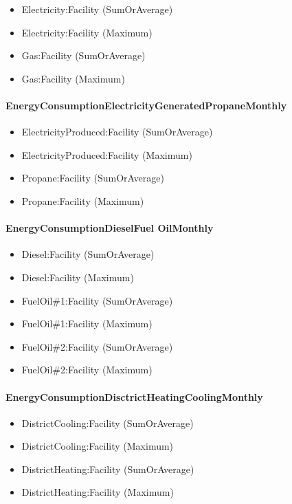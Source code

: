 \begin{itemize}
\item
  Electricity:Facility (SumOrAverage)
\item
  Electricity:Facility (Maximum)
\item
  Gas:Facility (SumOrAverage)
\item
  Gas:Facility (Maximum)
\end{itemize}

\paragraph{EnergyConsumptionElectricityGeneratedPropaneMonthly}\label{energyconsumptionelectricitygeneratedpropanemonthly}

\begin{itemize}
\item
  ElectricityProduced:Facility (SumOrAverage)
\item
  ElectricityProduced:Facility (Maximum)
\item
  Propane:Facility (SumOrAverage)
\item
  Propane:Facility (Maximum)
\end{itemize}

\paragraph{EnergyConsumptionDieselFuel OilMonthly}\label{energyconsumptiondieselfuel-oilmonthly}

\begin{itemize}
\item
  Diesel:Facility (SumOrAverage)
\item
  Diesel:Facility (Maximum)
\item
  FuelOil\#1:Facility (SumOrAverage)
\item
  FuelOil\#1:Facility (Maximum)
\item
  FuelOil\#2:Facility (SumOrAverage)
\item
  FuelOil\#2:Facility (Maximum)
\end{itemize}

\paragraph{EnergyConsumptionDisctrictHeatingCoolingMonthly}\label{energyconsumptiondisctrictheatingcoolingmonthly}

\begin{itemize}
\item
  DistrictCooling:Facility (SumOrAverage)
\item
  DistrictCooling:Facility (Maximum)
\item
  DistrictHeating:Facility (SumOrAverage)
\item
  DistrictHeating:Facility (Maximum)
\end{itemize}

